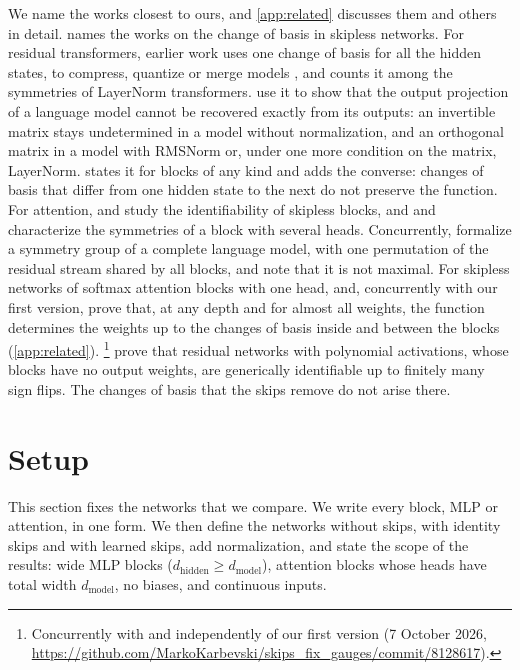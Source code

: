\documentclass[10pt]{article}
\theoremstyle{definition}
\theoremstyle{remark}
\newcommand{\dm}{d_{\mathrm{model}}}
\newcommand{\dhid}{d_{\mathrm{hidden}}}
\newif\ifanon \anonfalse
\begin{document}
We name the works closest to ours, and \cref{app:related} discusses them and others in detail.  names the works on the change of basis in skipless networks. For residual transformers, earlier work uses one change of basis for all the hidden states, to compress, quantize or merge models \citep{elhage2021circuits,ashkboos2024slicegpt,ashkboos2024quarot,liu2024spinquant,verma2024merging,theus2025glmc,sweeney2026transport}, and \citet{vannierop2024gauge} counts it among the symmetries of LayerNorm transformers. \citet[Lemma~4.2 and Appendix~C]{carlini2024stealing} use it to show that the output projection of a language model cannot be recovered exactly from its outputs: an invertible matrix stays undetermined in a model without normalization, and an orthogonal matrix in a model with RMSNorm or, under one more condition on the matrix, LayerNorm.  states it for blocks of any kind and adds the converse: changes of basis that differ from one hidden state to the next do not preserve the function. For attention, \citet{henry2025lightning} and \citet{henry2026generic} study the identifiability of skipless blocks, and \citet{tran2025equivariant} and \citet{wang2025gauge} characterize the symmetries of a block with several heads. Concurrently, \citet{wolanowsky2026metanetworks} formalize a symmetry group of a complete language model, with one permutation of the residual stream shared by all blocks, and note that it is not maximal. For skipless networks of softmax attention blocks with one head, \citet{amarel2026identifiability} and, concurrently with our first version, \citet{konda2026identifiability} prove that, at any depth and for almost all weights, the function determines the weights up to the changes of basis inside and between the blocks (\cref{app:related}). \citet{dahlgren2026polynomial}\ifanon\footnote{Concurrent work.}\else\footnote{Concurrently with and independently of our first version (7 October 2026, \url{https://github.com/MarkoKarbevski/skips_fix_gauges/commit/8128617}).}\fi{} prove that residual networks with polynomial activations, whose blocks have no output weights, are generically identifiable up to finitely many sign flips. The changes of basis that the skips remove do not arise there.

\section{Setup}\label{sec:setup}
This section fixes the networks that we compare. We write every block, MLP or attention, in one form. We then define the networks without skips, with identity skips and with learned skips, add normalization, and state the scope of the results: wide MLP blocks ($\dhid \ge \dm$), attention blocks whose heads have total width $\dm$, no biases, and continuous inputs.
\end{document}
